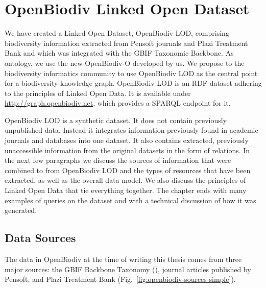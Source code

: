 \chapter{OpenBiodiv Linked Open Dataset}
\label{chapter-lod}

We have created a Linked Open Dataset, OpenBiodiv LOD, comprising biodiversity information extracted from Pensoft journals and Plazi Treatment Bank and which was integrated with the GBIF Taxonomic Backbone. As ontology, we use the new \mbox{OpenBiodiv-O} developed by us. We propose to the biodiversity informatics community to use OpenBiodiv LOD as the central point for a biodiversity knowledge graph. OpenBiodiv LOD is an RDF dataset adhering to the principles of Linked Open Data. It is available under \url{http://graph.openbiodiv.net}, which provides a SPARQL endpoint for it.

OpenBiodiv LOD is a synthetic dataset. It does not contain previously unpublished data. Instead it integrates information previously found in academic journals and databases into one dataset. It also contains  extracted, previously unaccessible information from the original datasets in the form of relations. In the next few paragraphs we discuss the sources of information that were combined to from OpenBiodiv LOD and the types of resources that have been extracted, as well as the overall data model. We also discuss the principles of Linked Open Data that tie everything together. The chapter ends with many examples of queries on the dataset and with a technical discussion of how it was generated.

\section{Data Sources}

The data in OpenBiodiv at the time of writing this thesis comes from three major sources: the GBIF Backbone Taxonomy (\cite{gbif_secretariat_gbif_2017}), journal articles published by Pensoft, and Plazi Treatment Bank (Fig.~\ref{fig:openbiodiv-sources-simple}).

